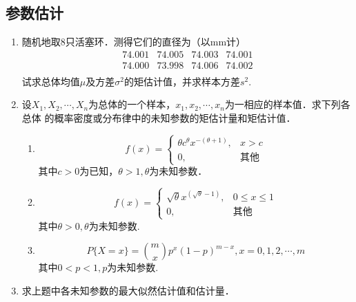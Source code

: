 \subsection{参数估计}

\begin{enumerate}


    \item 随机地取8只活塞环．测得它们的直径为（以mm计）
    $$\begin{array}{cccc}
        74.001 & 74.005 & 74.003 & 74.001 \\
        74.000 & 73.998 & 74.006 & 74.002 \\
    \end{array}$$
    试求总体均值$\mu$及方差$\sigma^2$的矩估计值，并求样本方差$s^2$.



    \item 设$X_1,X_2,\cdots,X_n$为总体的一个样本，$x_1,x_2,\cdots,x_n$为一相应的样本值．求下列各总体
    的概率密度或分布律中的未知参数的矩估计量和矩估计值．
    \begin{enumerate}
        \item $$f(x)=\left\{\begin{array}{ll}
            \theta c^\theta x^{-(\theta+1)}, & x>c \\
            0, & \mbox{其他}
        \end{array}\right.$$
        其中$c>0$为已知，$\theta>1,\theta$为未知参数．
        \item $$f(x)=\left\{\begin{array}{ll}
            \sqrt{\theta}  x^{(\sqrt{\theta}-1)}, & 0\leq x\leq 1 \\
            0, & \mbox{其他}
        \end{array}\right.$$
        其中$\theta >0,\theta$为未知参数.
        \item $$P\{X=x\}=\binom{m}{x} p^x (1-p)^{m-x},x=0,1,2,\cdots,m$$其中$0<p<1,p$为未知参数. 
    \end{enumerate}



    \item 求上题中各未知参数的最大似然估计值和估计量．
    





\end{enumerate}
